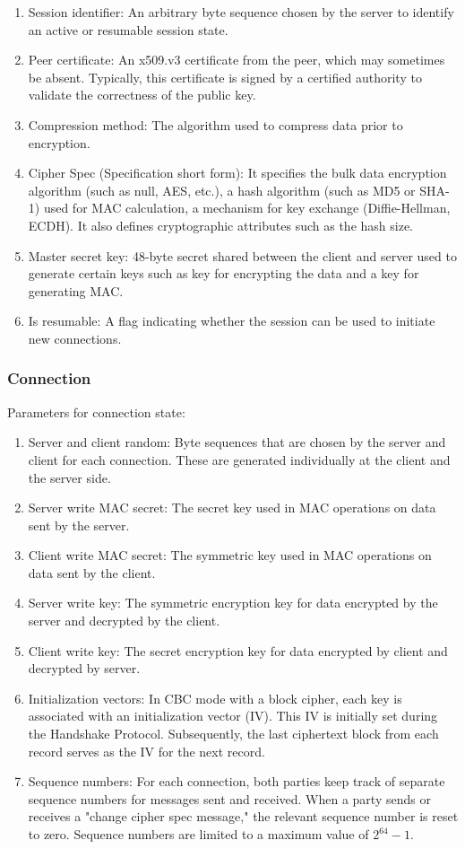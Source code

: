 \documentclass[11pt]{article}
\begin{document}
\begin{enumerate}
    \item Session identifier: An arbitrary byte sequence chosen by the server to identify an active or resumable session state.
    \item Peer certificate: An x509.v3 certificate from the peer, which may sometimes be absent. Typically, this certificate is signed by a certified authority to validate the correctness of the public key.
    \item Compression method: The algorithm used to compress data prior to encryption.
    \item Cipher Spec (Specification short form): It specifies the bulk data encryption algorithm (such as null, AES, etc.), a hash algorithm (such as MD5 or SHA-1) used for MAC calculation, a mechanism for key exchange (Diffie-Hellman, ECDH). It also defines cryptographic attributes such as the hash size.
    \item Master secret key: 48-byte secret shared between the client and server used to generate certain keys such as key for encrypting the data and a key for generating MAC.
    \item Is resumable: A flag indicating whether the session can be used to initiate new connections.
\end{enumerate}

\subsubsection{Connection}

Parameters for connection state:

\begin{enumerate}
    \item Server and client random: Byte sequences that are chosen by the server and client for each connection. These are generated individually at the client and the server side.
    \item Server write MAC secret: The secret key used in MAC operations on data sent by the server.
    \item Client write MAC secret: The symmetric key used in MAC operations on data sent by the client.
    \item Server write key: The symmetric encryption key for data encrypted by the server and decrypted by the client.
    \item Client write key: The secret encryption key for data encrypted by client and decrypted by server.
    \item Initialization vectors: In CBC mode with a block cipher, each key is associated with an initialization vector (IV). This IV is initially set during the Handshake Protocol. Subsequently, the last ciphertext block from each record serves as the IV for the next record.
    \item Sequence numbers: For each connection, both parties keep track of separate sequence numbers for messages sent and received. When a party sends or receives a "change cipher spec message," the relevant sequence number is reset to zero. Sequence numbers are limited to a maximum value of $2^{64} - 1$.
\end{enumerate}
\end{document}
